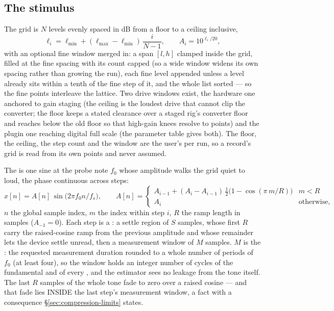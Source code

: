 \documentclass[11pt,a4paper]{article}
\begin{document}
\subsection{The stimulus}
\label{sec:compression-stimulus}
The grid is $N$ levels evenly spaced in dB from a floor to a ceiling
inclusive,
\begin{equation}
  \ell_i = \ell_{\min} + (\ell_{\max} - \ell_{\min})\,\frac{i}{N - 1},
  \qquad A_i = 10^{\ell_i/20},
  \label{eq:probegrid}
\end{equation}
with an optional fine window merged in: a span $[l, h]$ clamped inside
the grid, filled at the fine spacing with its count capped (so a wide
window widens its own spacing rather than growing the run), each fine
level appended unless a level already sits within a tenth of the fine
step of it, and the whole list sorted --- so the fine points interleave
the lattice. Two drive windows exist, the hardware one anchored to gain
staging (the ceiling is the loudest drive that cannot clip the converter;
the floor keeps a stated clearance over a staged rig's converter floor and
reaches below the old floor so that high-gain knees resolve to points) and
the plugin one reaching digital full scale (the parameter table gives
both). The floor, the ceiling, the step count and the window are the
user's per run, so a record's grid is read from its own points and never
assumed.

The  is one sine at the probe note $f_0$ whose
amplitude walks the grid quiet to loud, the phase continuous across
steps:
\begin{equation}
  x[n] = A[n]\,\sin\!\big(2\pi f_0 n / f_s\big),\qquad
  A[n] = \begin{cases}
    A_{i-1} + (A_i - A_{i-1})\,\tfrac12\big(1 - \cos(\pi\, m/R)\big) & m < R \\
    A_i & \text{otherwise,}
  \end{cases}
  \label{eq:steppedtone}
\end{equation}
$n$ the global sample index, $m$ the index within step $i$, $R$ the ramp
length in samples ($A_{-1} = 0$). Each step is a : a
settle region of $S$ samples, whose first $R$ carry the raised-cosine
ramp from the previous amplitude and whose remainder lets the device
settle unread, then a measurement window of $M$ samples. $M$ is the
: the requested measurement duration rounded to a whole
number of periods of $f_0$ (at least four), so the window holds an
integer number of cycles of the fundamental and of every
, and the estimator sees no leakage from the tone
itself. The last $R$ samples of the whole tone fade to zero over a
raised cosine --- and that fade lies INSIDE the last step's measurement
window, a fact with a consequence \S\ref{sec:compression-limits} states.
\end{document}
